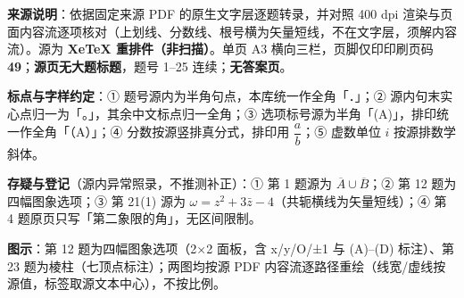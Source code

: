 


\begin{gktip}
\textbf{来源说明}：依据固定来源 PDF 的原生文字层逐题转录，并对照 400 dpi 渲染与页面内容流逐项核对（上划线、分数线、根号横为矢量短线，不在文字层，须解内容流）。源为 \textbf{XeTeX 重排件（非扫描）}。单页 A3 横向三栏，页脚仅印印刷页码 \textbf{49}；\textbf{源页无大题标题}，题号 1–25 连续；\textbf{无答案页}。

\textbf{标点与字样约定}：① 题号源内为半角句点，本库统一作全角「．」；② 源内句末实心点归一为「。」，其余中文标点归一全角；③ 选项标号源为半角「(A)」，排印统一作全角「（A）」；④ 分数按源竖排真分式，排印用 \(\dfrac{a}{b}\)；⑤ 虚数单位 \(i\) 按源排数学斜体。

\textbf{存疑与登记}（源内异常照录，不推测补正）：① 第 1 题源为 \(\overline{A}\cup\overline{B}\)；② 第 12 题为四幅图象选项；③ 第 21(1) 源为 \(\omega=z^2+3\bar z-4\)（共轭横线为矢量短线）；④ 第 4 题原页只写「第二象限的角」，无区间限制。

\textbf{图示}：第 12 题为四幅图象选项（2×2 面板，含 x/y/O/±1 与 (A)–(D) 标注）、第 23 题为棱柱（七顶点标注）；两图均按源 PDF 内容流逐路径重绘（线宽/虚线按源值，标签取源文本中心），不按比例。
\end{gktip}

